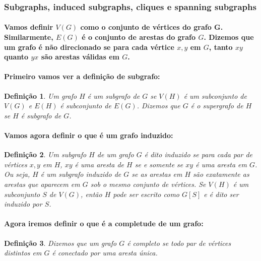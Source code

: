 \documentclass[a4paper,10pt]{article}
\theoremstyle{plain}
\newtheorem*{spn-def}{Definição}
\begin{document}
\subsubsection{Subgraphs, induced subgraphs, cliques e spanning subgraphs}

\paragraph{
  Vamos definir $V(G)$ como o conjunto de vértices do grafo G. Similarmente, $E(G)$ é o conjunto de
  arestas do grafo $G$. Dizemos que um grafo é não direcionado se para cada vértice $x, y$ em $G$,
  tanto $xy$ quanto $yx$ são arestas válidas em $G$.
}

\paragraph{
  Primeiro vamos ver a definição de subgrafo:
}

\begin{spn-def} Um grafo $H$ é um subgrafo de $G$ se $V(H)$ é um subconjunto de $V(G)$ e $E(H)$ é
  subconjunto de $E(G)$. Dizemos que $G$ é o supergrafo de $H$ se $H$ é subgrafo de $G$.
\end{spn-def}

\paragraph{
  Vamos agora definir o que é um grafo induzido:
}

\begin{spn-def} Um subgrafo $H$ de um grafo $G$ é dito induzido se para cada par de vértices $x, y$
  em $H$, $xy$ é uma aresta de $H$ se e somente se $xy$ é uma aresta em $G$. Ou seja, $H$ é 
  um subgrafo induzido de $G$ se as arestas em $H$ são exatamente as arestas que aparecem em $G$ 
  sob o mesmo conjunto de vértices. Se $V(H)$ é um subconjunto $S$ de $V(G)$, então $H$ pode ser
  escrito como $G[S]$ e é dito ser induzido por $S$.
\end{spn-def}

\paragraph{
  Agora iremos definir o que é a completude de um grafo:
}

\begin{spn-def} Dizemos que um grafo $G$ é completo se todo par de vértices distintos em $G$ é 
  conectado por uma aresta única.
\end{spn-def}
\end{document}
